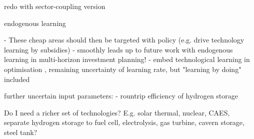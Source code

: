 redo with sector-coupling version

endogenous learning

- These cheap areas should then be targeted with policy (e.g. drive technology learning by subsidies)
- smoothly leads up to future work with endogenous learning in multi-horizon investment planning!
- embed technological learning in optimisation \cite{heuberger_power_2017} \cite{lopion_cost_2019}, remaining uncertainty of learning rate, but "learning by doing" included

further uncertain input parameters:
- rountrip efficiency of hydrogen storage

Do I need a richer set of technologies? E.g.
solar thermal, nuclear, CAES, separate hydrogen storage to fuel cell, electrolysis, gas turbine, cavern storage, steel tank?
